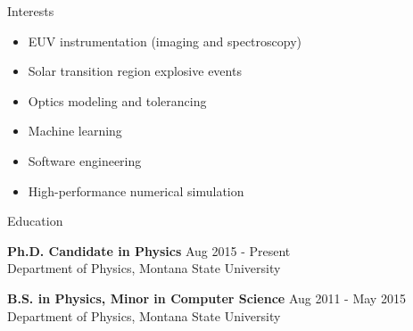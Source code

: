 \documentclass{resume} %
\begin{document}
	
	



%
%
%

\begin{rSection}{Interests}
	\begin{minipage}{0.5\textwidth}
		\begin{itemize}[leftmargin=*]
			\item EUV instrumentation (imaging and spectroscopy)
			\item Solar transition region explosive events
			\item Optics modeling and tolerancing
		\end{itemize}
	\end{minipage}
	\begin{minipage}{0.5\textwidth}
		\begin{itemize}[leftmargin=*]
			\item Machine learning
			\item Software engineering
			\item High-performance numerical simulation
		\end{itemize}
	\end{minipage}
\end{rSection} 

\begin{rSection}{Education}

{\bf Ph.D. Candidate in Physics} \hfill {\selectfont Aug 2015 - Present}
\\
Department of Physics, Montana State University

{\bf B.S. in Physics, Minor in Computer Science} \hfill {\selectfont Aug 2011 - May 2015 }
\\
Department of Physics, Montana State University

\end{rSection}
\end{document}

